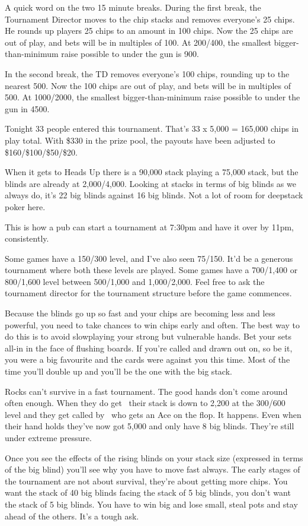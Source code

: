 A quick word on the two 15 minute breaks. During the first break,
the Tournament Director moves to the chip stacks and removes
everyone's 25 chips. He rounds up players 25 chips to an amount
in 100 chips. Now the 25 chips are out of play, and bets will be
in multiples of 100. At 200/400, the smallest bigger-than-minimum
raise possible to under the gun is 900.

In the second break, the TD removes everyone's 100 chips, rounding up
to the nearest 500. Now the 100 chips are out of play, and bets
will be in multiples of 500. At 1000/2000, the smallest
bigger-than-minimum raise possible to under the gun in 4500.

Tonight 33 people entered this tournament. That's 33 x 5,000 = 165,000
chips in play total. With \$330 in the prize pool, the payouts have been
adjusted to \$160/\$100/\$50/\$20.

When it gets to Heads Up there is a 90,000 stack
playing a 75,000 stack, but the blinds are already at 2,000/4,000.
Looking at stacks in terms of big blinds as we always do,
it's 22 big blinds against 16 big blinds. Not a lot of room for deepstack
poker here.

This is how a pub can start a tournament at 7:30pm and have it over
by 11pm, consistently.

Some games have a 150/300 level, and I've also seen 75/150. It'd be
a generous tournament where both these levels are played. Some games
have a 700/1,400 or 800/1,600 level between 500/1,000 and 1,000/2,000.  Feel
free to ask the tournament director for the tournament structure before
the game commences.

Because the blinds go up so fast and your chips are becoming less and
less powerful, you need to take chances to win chips early and often.
The best way to do this is to avoid slowplaying your strong but
vulnerable hands. Bet your sets all-in in the face of flushing boards.
If you're called and drawn out on, so be it, you were a big favourite
and the cards were against you this time. Most of the time you'll double
up and you'll be the one with the big stack.

Rocks can't survive in a fast tournament. The good hands don't come
around often enough. When they do get \Kh\Kc\ their stack is down to 2,200 at
the 300/600 level and they get called by \As\Qs\ who gets an Ace on the flop.
It happens. Even when their hand holds they've now got 5,000 and only have
8 big blinds. They're still under extreme pressure.

Once you see the effects of the rising blinds on your stack size
(expressed in terms of the big blind) you'll see why you have to move
fast always. The early stages of the tournament are not about survival,
they're about getting more chips. You want the stack of 40 big blinds facing
the stack of 5 big blinds, you don't want the stack of 5 big blinds. You
have to win big and lose small, steal pots and stay ahead of the others.
It's a tough ask.

